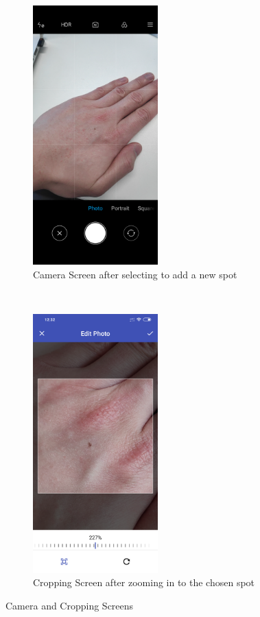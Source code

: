 \begin{figure}[t!]
    \centering
    \begin{subfigure}[t]{0.5\textwidth}
        \centering
        \includegraphics[height=10cm]{figures/camera1.png}
        \caption{Camera Screen after selecting to add a new spot}
    \end{subfigure}%
    ~
    \begin{subfigure}[t]{0.5\textwidth}
        \centering
        \includegraphics[height=10cm]{figures/crop1.png}
        \caption{Cropping Screen after zooming in to the chosen spot}
    \end{subfigure}
    \caption{Camera and Cropping Screens}
    \label{fig:cameraandcrop}
\end{figure}

